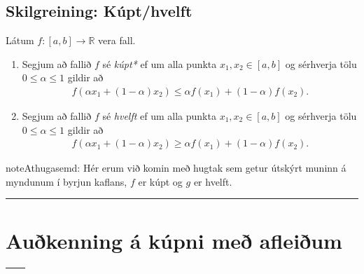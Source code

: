 \documentclass[a4paper,10pt,icelandic]{sphinxmanual}
\begin{document}
\subsection{Skilgreining: Kúpt/hvelft}
\label{\detokenize{kafli05:skilgreining-kupt-hvelft}}\label{\detokenize{kafli05:index-0}}
Látum \(f:[a, b]\rightarrow {\mathbb  R}\) vera fall.
\begin{enumerate}
\item {} 
Segjum að fallið \(f\) sé \textit{kúpt*} ef um
alla punkta \(x_1, x_2\in [a, b]\) og sérhverja tölu
\(0\leq
\alpha\leq 1\) gildir að
\begin{equation*}
\begin{split}f(\alpha x_1+(1-\alpha)x_2)\leq \alpha f(x_1)+(1-\alpha)f(x_2).\end{split}
\end{equation*}
\item {} 
Segjum að fallið \(f\) sé \textit{hvelft}
ef um alla punkta \(x_1, x_2\in [a, b]\) og sérhverja tölu
\(0\leq
\alpha\leq 1\) gildir að
\begin{equation*}
\begin{split}f(\alpha x_1+(1-\alpha)x_2)\geq \alpha f(x_1)+(1-\alpha)f(x_2).\end{split}
\end{equation*}
\end{enumerate}

\begin{sphinxadmonition}{note}{Athugasemd:}
Hér erum við komin með hugtak sem getur útskýrt muninn á myndunum í byrjun
kaflans, \(f\) er kúpt og \(g\) er hvelft.
\end{sphinxadmonition}


\bigskip\hrule\bigskip



\section{Auðkenning á kúpni með afleiðum}
\label{\detokenize{kafli05:aukenning-a-kupni-me-afleium}}

\begin{savenotes}\sphinxattablestart
\centering
\begin{tabulary}{\linewidth}[t]{|T|T|}
\hline
{}\label{\detokenize{kafli05:id1}}
&\label{\detokenize{kafli05:id2}}
\\
\hline
\end{tabulary}
\par
\sphinxattableend\end{savenotes}
\end{document}
